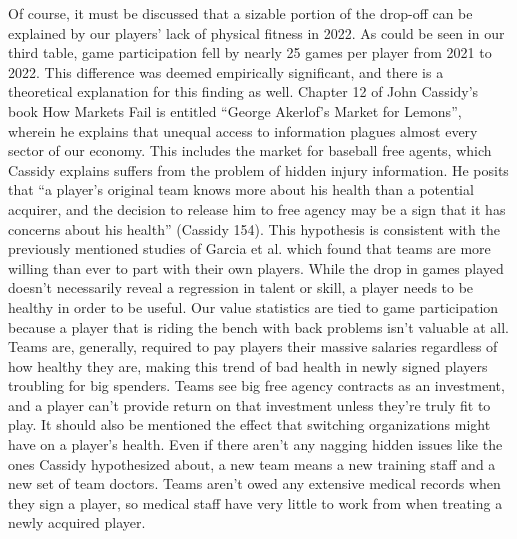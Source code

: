 \documentclass[10pt]{article}
\begin{document}
Of course, it must be discussed that a sizable portion of the drop-off can be explained by our players’ lack of physical 
fitness in 2022. As could be seen in our third table, game participation fell by nearly 25 games per player from 2021 to 2022. 
This difference was deemed empirically significant, and there is a theoretical explanation for this finding as well. Chapter 
12 of John Cassidy’s book How Markets Fail is entitled “George Akerlof’s Market for Lemons”, wherein he explains that unequal 
access to information plagues almost every sector of our economy. This includes the market for baseball free agents, which 
Cassidy explains suffers from the problem of hidden injury information. He posits that “a player’s original team knows more 
about his health than a potential acquirer, and the decision to release him to free agency may be a sign that it has concerns 
about his health” (Cassidy 154). This hypothesis is consistent with the previously mentioned studies of Garcia et al. which 
found that teams are more willing than ever to part with their own players. While the drop in games played doesn’t necessarily 
reveal a regression in talent or skill, a player needs to be healthy in order to be useful. Our value statistics are tied to 
game participation because a player that is riding the bench with back problems isn’t valuable at all. Teams are, generally, 
required to pay players their massive salaries regardless of how healthy they are, making this trend of bad health in newly 
signed players troubling for big spenders. Teams see big free agency contracts as an investment, and a player can’t provide 
return on that investment unless they’re truly fit to play. It should also be mentioned the effect that switching organizations 
might have on a player’s health. Even if there aren’t any nagging hidden issues like the ones Cassidy hypothesized about, a 
new team means a new training staff and a new set of team doctors. Teams aren’t owed any extensive medical records when they 
sign a player, so medical staff have very little to work from when treating a newly acquired player.
\end{document}
